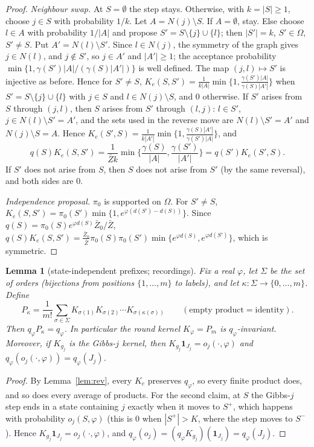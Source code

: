 \documentclass[11pt]{article}
\newtheorem{lemma}{Lemma}[section]
\theoremstyle{remark}
\newcommand{\Zb}{\bar Z}
\newcommand{\ind}{\mathbf 1}
\newcommand{\Om}{\Omega}
\begin{document}
\begin{proof}
\emph{Neighbour swap.} At $S=\emptyset$ the step stays. Otherwise, with $k=|S|\ge1$, choose $j\in S$ with probability $1/k$. Let $A=N(j)\setminus S$. If $A=\emptyset$, stay. Else choose $l\in A$ with probability $1/|A|$ and propose $S'=S\setminus\{j\}\cup\{l\}$; then $|S'|=k$, $S'\in\Om$, $S'\ne S$. Put $A'=N(l)\setminus S'$. Since $l\in N(j)$, the symmetry of the graph gives $j\in N(l)$, and $j\notin S'$, so $j\in A'$ and $|A'|\ge1$; the acceptance probability $\min\{1,\gamma(S')|A|/(\gamma(S)|A'|)\}$ is well defined. The map $(j,l)\mapsto S'$ is injective as before. Hence for $S'\neq S$, $K_e(S,S')=\frac1{k|A|}\min\{1,\frac{\gamma(S')|A|}{\gamma(S)|A'|}\}$ when $S'=S\setminus\{j\}\cup\{l\}$ with $j\in S$ and $l\in N(j)\setminus S$, and $0$ otherwise. If $S'$ arises from $S$ through $(j,l)$, then $S$ arises from $S'$ through $(l,j)$: $l\in S'$, $j\in N(l)\setminus S'=A'$, and the sets used in the reverse move are $N(l)\setminus S'=A'$ and $N(j)\setminus S=A$. Hence $K_e(S',S)=\frac1{k|A'|}\min\{1,\frac{\gamma(S)|A'|}{\gamma(S')|A|}\}$, and
\[ q(S)K_e(S,S')=\frac{1}{\Zb k}\min\Big\{\frac{\gamma(S)}{|A|},\frac{\gamma(S')}{|A'|}\Big\}=q(S')K_e(S',S). \]
If $S'$ does not arise from $S$, then $S$ does not arise from $S'$ (by the same reversal), and both sides are $0$.

\emph{Independence proposal.} $\pi_0$ is supported on $\Om$. For $S'\ne S$, $K_e(S,S')=\pi_0(S')\min\{1,e^{\varphi(d(S')-d(S))}\}$. Since $q(S)=\pi_0(S)e^{\varphi d(S)}\Zb_0/\Zb$,
$q(S)K_e(S,S')=\frac{\Zb_0}{\Zb}\pi_0(S)\pi_0(S')\min\{e^{\varphi d(S)},e^{\varphi d(S')}\}$, which is symmetric.
\end{proof}

\begin{lemma}[state-independent prefixes; recordings]\label{lem:prefix}
Fix a real $\varphi$, let $\Sigma$ be the set of orders (bijections from positions $\{1,\dots,m\}$ to labels), and let $\kappa:\Sigma\to\{0,\dots,m\}$. Define
\[ P_\kappa=\frac1{m!}\sum_{\sigma\in\Sigma}K_{\sigma(1)}K_{\sigma(2)}\cdots K_{\sigma(\kappa(\sigma))}\qquad(\text{empty product}=\text{identity}). \]
Then $q_\varphi P_\kappa=q_\varphi$. In particular the round kernel $K_\varphi=P_m$ is $q_\varphi$-invariant. Moreover, if $K_{g_j}$ is the Gibbs-$j$ kernel, then $K_{g_j}\ind_{J_j}=o_j(\cdot,\varphi)$ and $q_\varphi(o_j(\cdot,\varphi))=q_\varphi(J_j)$.
\end{lemma}
\begin{proof}
By Lemma~\ref{lem:rev}, every $K_e$ preserves $q_\varphi$, so every finite product does, and so does every average of products. For the second claim, at $S$ the Gibbs-$j$ step ends in a state containing $j$ exactly when it moves to $S^+$, which happens with probability $o_j(S,\varphi)$ (this is $0$ when $|S^+|>K$, where the step moves to $S^-$). Hence $K_{g_j}\ind_{J_j}=o_j(\cdot,\varphi)$, and $q_\varphi(o_j)=(q_\varphi K_{g_j})(\ind_{J_j})=q_\varphi(J_j)$.
\end{proof}
\end{document}
